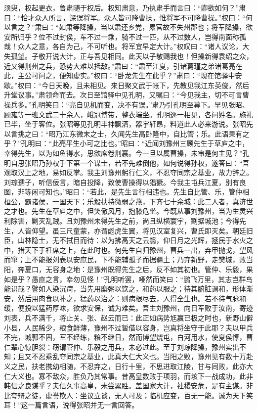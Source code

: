 须臾，权起更衣，鲁肃随于权后。权知肃意，乃执肃手而言曰：“卿欲如何？”肃曰：“恰才众人所言，深误将军。众人皆可降曹操，惟将军不可降曹操。”权曰：“何以言之？”肃曰：“如肃等降操，当以肃还乡党，累官故不失州郡也；将军降操，欲安所归乎？位不过封侯，车不过一乘，骑不过一匹，从不过数人，岂得南面称孤哉！众人之意，各自为己，不可听也。将军宜早定大计。”权叹曰：“诸人议论，大失孤望。子敬开说大计，正与吾见相同。此天以子敬赐我也！但操新得袁绍之众，近又得荆州之兵，恐势大难以抵敌。”肃曰：“肃至江夏，引诸葛瑾之弟诸葛亮在此，主公可问之，便知虚实。”权曰：“卧龙先生在此乎？”肃曰：“现在馆驿中安歇。”权曰：“今日天晚，且未相见。来日聚文武于帐下，先教见我江东英俊，然后升堂议事。”肃领命而去。次日至馆驿中见孔明，又嘱曰：“今见我主，切不可言曹操兵多。”孔明笑曰：“亮自见机而变，决不有误。”肃乃引孔明至幕下。早见张昭、顾雍等一班文武二十余人，峨冠博带，整衣端坐。孔明逐一相见，各问姓名。施礼已毕，坐于客位。张昭等见孔明丰神飘洒，器宇轩昂，料道此人必来游说。张昭先以言挑之曰：“昭乃江东微末之士，久闻先生高卧隆中，自比管；乐。此语果有之乎？”孔明曰：“此亮平生小可之比也。”昭曰：“近闻刘豫州三顾先生于草庐之中，幸得先生，以为如鱼得水，思欲席卷荆襄。今一旦以属曹操，未审是何主见？”孔明自思张昭乃孙权手下第一个谋士，若不先难倒他，如何说得孙权，遂答曰：“吾观取汉上之地，易如反掌。我主刘豫州躬行仁义，不忍夺同宗之基业，故力辞之。刘琮孺子，听信佞言，暗自投降，致使曹操得以猖獗。今我主屯兵江夏，别有良图，非等闲可知也。”昭曰：“若此，是先生言行相违也。先生自比管、乐，管仲相桓公，霸诸侯，一国天下；乐毅扶持微弱之燕，下齐七十余城：此二人者，真济世之才也。先生在草庐之中，但笑傲风月，抱膝危坐。今既从事刘豫州，当为生灵兴利除害，剿灭乱贼。且刘豫州未得先生之前，尚且纵横寰宇，割据城池；今得先生，人皆仰望。虽三尺童蒙，亦谓彪虎生翼，将见汉室复兴，曹氏即灭矣。朝廷旧臣，山林隐士，无不拭目而待：以为拂高天之云翳，仰日月之光辉，拯民于水火之中，措天下于衽席之上，在此时也。何先生自归豫州，曹兵一出，弃甲抛戈，望风而窜；上不能报刘表以安庶民，下不能辅孤子而据疆土；乃弃新野，走樊城，败当阳，奔夏口，无容身之地：是豫州既得先生之后，反不如其初也。管仲、乐毅，果如是乎？愚直之言，幸勿见怪！”孔明听罢，哑然而笑曰：“鹏飞万里，其志岂群鸟能识哉？譬如人染沉疴，当先用糜粥以饮之，和药以服之；待其腑脏调和，形体渐安，然后用肉食以补之，猛药以治之：则病根尽去，人得全生也。若不待气脉和缓，便投以猛药厚味，欲求安保，诚为难矣。吾主刘豫州，向日军败于汝南，寄迹刘表，兵不满千，将止关、张、赵云而已：此正如病势尪赢已极之时也，新野山僻小县，人民稀少，粮食鲜薄，豫州不过暂借以容身，岂真将坐守于此耶？夫以甲兵不完，城郭不固，军不经练，粮不继日，然而博望烧屯，白河用水，使夏侯惇，曹仁辈心惊胆裂：窃谓管仲、乐毅之用兵，未必过此。至于刘琮降操，豫州实出不知；且又不忍乘乱夺同宗之基业，此真大仁大义也。当阳之败，豫州见有数十万赴义之民，扶老携幼相随，不忍弃之，日行十里，不思进取江陵，甘与同败，此亦大仁大义也。寡不敌众，胜负乃其常事。昔高皇数败于项羽，而垓下一战成功，此非韩信之良谋乎？夫信久事高皇，未尝累胜。盖国家大计，社稷安危，是有主谋。非比夸辩之徒，虚誉欺人：坐议立谈，无人可及；临机应变，百无一能。诚为天下笑耳！”这一篇言语，说得张昭并无一言回答。


